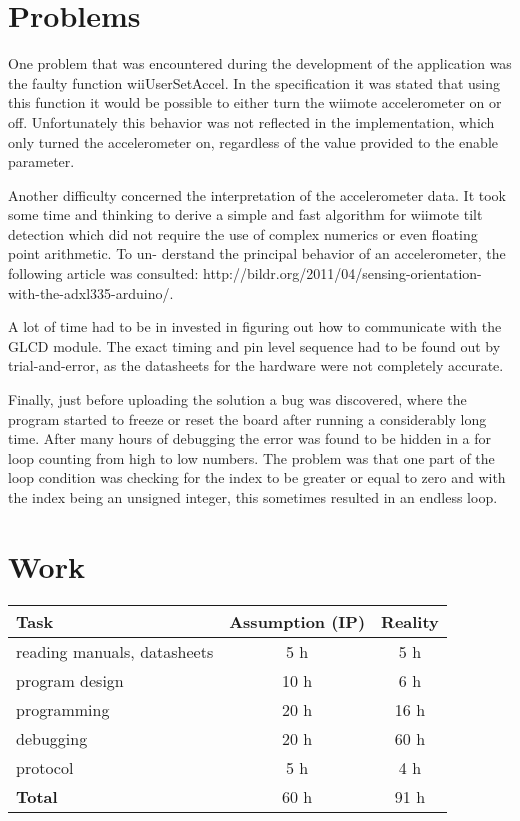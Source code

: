\documentclass[12pt,a4paper,titlepage,oneside]{article}
\begin{document}
\section{Problems}

One problem that was encountered during the development of the application was the faulty
function wiiUserSetAccel. In the specification it was stated that using this function it would be
possible to either turn the wiimote accelerometer on or off. Unfortunately this behavior was
not reflected in the implementation, which only turned the accelerometer on, regardless of the
value provided to the enable parameter.

Another difficulty concerned the interpretation of the accelerometer data. It took some
time and thinking to derive a simple and fast algorithm for wiimote tilt detection which
did not require the use of complex numerics or even floating point arithmetic. To un-
derstand the principal behavior of an accelerometer, the following article was consulted:
http://bildr.org/2011/04/sensing-orientation-with-the-adxl335-arduino/.

A lot of time had to be in invested in figuring out how to communicate with the GLCD
module. The exact timing and pin level sequence had to be found out by trial-and-error, as the
datasheets for the hardware were not completely accurate.

Finally, just before uploading the solution a bug was discovered, where the program started to
freeze or reset the board after running a considerably long time. After many hours of debugging
the error was found to be hidden in a for loop counting from high to low numbers. The problem
was that one part of the loop condition was checking for the index to be greater or equal to
zero and with the index being an unsigned integer, this sometimes resulted in an endless loop.

\section{Work}

\begin{tabular}{|l|c|c|}\hline
	Task & Assumption (IP) & Reality \\ \hline

	reading manuals, datasheets &  5 h &  5 h\\
	program design              & 10 h &  6 h\\
	programming                 & 20 h & 16 h\\
	debugging                   & 20 h & 60 h\\
	protocol                    & 5  h &  4 h\\ \hline

	\textbf{Total}              & 60 h & 91 h\\ \hline
\end{tabular}


\newpage
\end{document}
